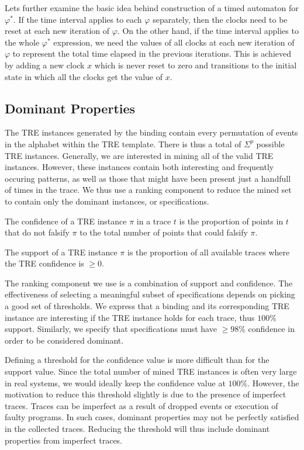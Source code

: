 \documentclass[]{sigplanconf}
\begin{document}
Lets further examine the basic idea behind construction of a timed automaton for $\varphi^*$. If the time interval applies to each $\varphi$ separately, then the clocks need to be reset at each new iteration of $\varphi$. On the other hand, if the time interval applies to the whole $\varphi^*$ expression, we need the values of all clocks at each new iteration of $\varphi$ to represent the total time elapsed in the previous iterations. This is achieved by adding a new clock $x$ which is never reset to zero and transitions to the initial state in which all the clocks get the value of $x$.


\subsection{Dominant Properties}

The TRE instances generated by the binding contain every permutation of events in the alphabet within the TRE template. There is thus a total of $\Sigma^p$ possible TRE instances. Generally, we are interested in mining all of the valid TRE instances.
However, these instances contain both interesting and frequently occuring patterns, as well as those that might have been present just a handfull of times in the trace. We thus use a ranking component to reduce the mined set to contain only the dominant instances, or specifications.


\begin{defns}[Confidence]
The confidence of a TRE instance $\pi$ in a trace $t$ is the proportion of points in $t$ that do not falsify $\pi$ to the total number of points that could falsify $\pi$.
\end{defns}

\begin{defns}[Support]
The support of a TRE instance $\pi$ is the proportion of all available traces where the TRE confidence is $\ge 0$.
\end{defns}


The ranking component we use is a combination of support and confidence. The effectiveness of selecting a meaningful subset of specifications depends on picking a good set of thresholds. We express that a binding and its corresponding TRE instance are interesting if the TRE instance holds for each trace, thus $100 \%$ support. Similarly, we specify that specifications must have $ \ge 98 \%$ confidence in order to be considered dominant.

Defining a threshold for the confidence value is more difficult than for the support value. Since the total number of mined TRE instances is often very large in real systems, we would ideally keep the confidence value at $100 \%$. However, the motivation to reduce this threshold slightly is due to the presence of imperfect traces. Traces can be imperfect as a result of dropped events or execution of faulty programs. In such cases, dominant properties may not be perfectly satisfied in the collected traces. Reducing the threshold will thus include dominant properties from imperfect traces.
\end{document}
